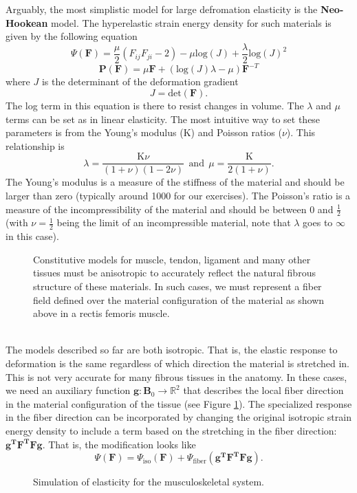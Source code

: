 \documentclass[article]{pcms-l}
\begin{document}
Arguably, the most simplistic model for large defromation elasticity is the {\bf Neo-Hookean} model. The hyperelastic strain energy density for such materials is given by the following equation
$$
\Psi(\mathbf{F})=\frac{\mu}{2}\left(F_{ij}F_{ji}-2\right)-\mu\textrm{log}(J)+\frac{\lambda}{2}\textrm{log}(J)^2
$$
$$
\mathbf{P}(\mathbf{F})=\mu\mathbf{F}+(\textrm{log}(J)\lambda-\mu)\mathbf{F}^{-T}
$$
where  $J$ is the determinant of the deformation gradient
$$
J=\textrm{det}(\mathbf{F}).
$$
The log term in this equation is there to resist changes in volume. The $\lambda$ and $\mu$ terms can be set as in linear elasticity. The most intuitive way to set these parameters is from the Young's modulus ($\textrm{K}$) and Poisson ratios ($\nu$). This relationship is
$$
\lambda=\frac{\textrm{K}\nu}{(1+\nu)(1-2\nu)} \ \ \textrm{and} \ \ \mu=\frac{\textrm{K}}{2(1+\nu)}.
$$
The Young's modulus is a measure of the stiffness of the material and should be larger than zero (typically around 1000 for our exercises). The Poisson's ratio is a measure of the incompressibility of the material and should be between 0 and $\frac{1}{2}$ (with $\nu=\frac{1}{2}$ being the limit of an incompressible material, note that $\lambda$ goes to $\infty$ in this case).\\
\begin{figure}
\caption{Constitutive models for muscle, tendon, ligament and many other tissues must be anisotropic to accurately reflect the natural fibrous structure of these materials. In such cases, we must represent a fiber field defined over the material configuration of the material as shown above in a rectis femoris muscle.}
\label{fibers}
\end{figure}
\\
The models described so far are both isotropic. That is, the elastic response to deformation is the same regardless of which direction the material is stretched in. This is not very accurate for many fibrous tissues in the anatomy. In these cases, we need an auxiliary function $\mathbf{g}:\mathbf{B}_0\rightarrow\mathbb{R}^2$ that describes the local fiber direction in the material configuration of the tissue (see Figure \ref{fibers}). The specialized response in the fiber direction can be incorporated by changing the original isotropic strain energy density to include a term based on the stretching in the fiber direction: $\mathbf{g^TF^TFg}$. That is, the modification looks like
$$
\Psi(\mathbf{F})=\Psi_\textrm{iso}(\mathbf{F})+\Psi_\textrm{fiber}(\mathbf{g^TF^TFg}).
$$
\begin{figure}
\caption{Simulation of elasticity for the musculoskeletal system.}
\end{figure}
\end{document}
